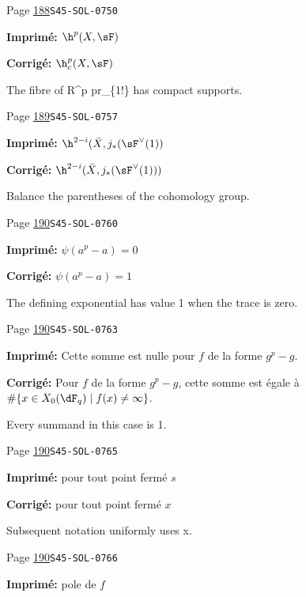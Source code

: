 \begin{description}
\smallskip
\item[\hypertarget{apparatus:FR-0156}{156}] Page \hyperlink{printpage:fr:188}{188}\quad\texttt{S45-SOL-0750}
\par\noindent\textbf{Imprimé:} \(\h^p(X,\sF)\)
\par\noindent\textbf{Corrigé:} \(\h_c^p(X,\sF)\)
\par\noindent The fibre of R\textasciicircum{}p pr\_\{1!\} has compact supports.
\smallskip
\item[\hypertarget{apparatus:FR-0157}{157}] Page \hyperlink{printpage:fr:189}{189}\quad\texttt{S45-SOL-0757}
\par\noindent\textbf{Imprimé:} \(\h^{2-i}(\bar X,j_\ast(\sF^\vee(1))\)
\par\noindent\textbf{Corrigé:} \(\h^{2-i}(\bar X,j_\ast(\sF^\vee(1)))\)
\par\noindent Balance the parentheses of the cohomology group.
\smallskip
\item[\hypertarget{apparatus:FR-0158}{158}] Page \hyperlink{printpage:fr:190}{190}\quad\texttt{S45-SOL-0760}
\par\noindent\textbf{Imprimé:} \(\psi(a^p-a)=0\)
\par\noindent\textbf{Corrigé:} \(\psi(a^p-a)=1\)
\par\noindent The defining exponential has value 1 when the trace is zero.
\smallskip
\item[\hypertarget{apparatus:FR-0159}{159}] Page \hyperlink{printpage:fr:190}{190}\quad\texttt{S45-SOL-0763}
\par\noindent\textbf{Imprimé:} Cette somme est nulle pour $f$ de la forme $g^p-g$.
\par\noindent\textbf{Corrigé:} Pour $f$ de la forme $g^p-g$, cette somme est égale à $\#\{x\in X_0(\dF_q)\mid f(x)\ne\infty\}$.
\par\noindent Every summand in this case is 1.
\smallskip
\item[\hypertarget{apparatus:FR-0160}{160}] Page \hyperlink{printpage:fr:190}{190}\quad\texttt{S45-SOL-0765}
\par\noindent\textbf{Imprimé:} pour tout point fermé $s$
\par\noindent\textbf{Corrigé:} pour tout point fermé $x$
\par\noindent Subsequent notation uniformly uses x.
\smallskip
\item[\hypertarget{apparatus:FR-0161}{161}] Page \hyperlink{printpage:fr:190}{190}\quad\texttt{S45-SOL-0766}
\par\noindent\textbf{Imprimé:} pole de $f$

\end{description}
